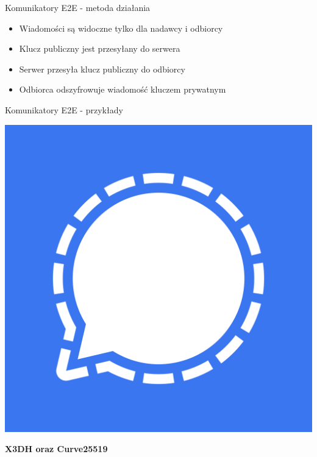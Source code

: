 \begin{frame}{Komunikatory E2E - metoda działania}
    \begin{itemize}
        \item Wiadomości są widoczne tylko dla nadawcy i odbiorcy
        \item Klucz publiczny jest przesyłany do serwera
        \item Serwer przesyła klucz publiczny do odbiorcy
        \item Odbiorca odszyfrowuje wiadomość kluczem prywatnym
    \end{itemize}
\end{frame}
\begin{frame}{Komunikatory E2E - przykłady}
    \begin{center}
        \begin{minipage}{0.1\textwidth}
            \includegraphics[width=\textwidth]{applications/graphics/Signal.png}
        \end{minipage}
        \begin{minipage}{0.6\textwidth}
            \textbf{X3DH oraz Curve25519}
        \end{minipage}

        \vspace{0.3cm}


\end{center}
\end{frame}
